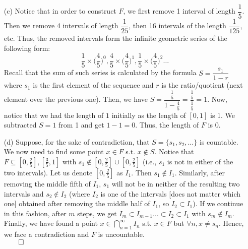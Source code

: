 \documentclass[11pt]{article}
\begin{document}
\begin{itemize}
\begin{itemize}
            \item[(c)]
                Notice that in order to construct $F$, we first remove 1
                interval of length $\dfrac{1}{5}$. Then we remove 4
                intervals of length $\dfrac{1}{25}$, then 16 intervals of
                the length $\dfrac{1}{125}$, etc. Thus, the removed intervals
                form the infinite geometric series of the following form:
                \begin{equation*}
                    \dfrac{1}{5} \times \Big(\dfrac{4}{5}\Big)^0, \dfrac{4}{5}
                    \times \Big(\dfrac{4}{5}\Big)^1, \dfrac{1}{5} \times
                    \Big(\dfrac{4}{5}\Big)^2 \dots
                \end{equation*}
                Recall that the sum of such series is calculated by the formula
                $S = \dfrac{s_1}{1 - r}$ where $s_1$ is the first element of
                the sequence and $r$ is the ratio/quotient (next element over
                the previous one). Then, we have $S = \dfrac{\frac{1}{5}}{1 -
                \frac{4}{5}} = \dfrac{\frac{1}{5}}{\frac{1}{5}} = 1$. Now,
                notice that we had the length of $1$ initially as the length of
                $[0, 1]$ is 1. We subtracted $S = 1$ from 1 and get $1 - 1 =
                0$. Thus, the length of $F$ is $0$.

            \item[(d)]
                Suppose, for the sake of contradiction, that $S = \{s_1, s_2,
                \dots\}$ is countable. We now need to find some point $x \in F$
                s.t. $x \notin S$. Notice that $F \subseteq [0, \frac{2}{5}],
                [\frac{3}{5}, 1]$ with $s_1 \notin [0, \frac{2}{5}] \cup [0,
                \frac{2}{5}]$ (i.e., $s_1$ is not in either of the two
                intervals). Let us denote $[0, \frac{2}{5}]$ as $I_1$. Then
                $s_1 \notin I_1$. Similarly, after removing the middle fifth of
                $I_1$, $s_1$ will not be in neither of the resulting two
                intervals and $s_2 \notin I_2$ (where $I_2$ is one of the
                intervals [does not matter which one] obtained after removing
                the middle half of $I_1$, so $I_2 \subset I_1$). If we continue
                in this fashion, after $m$ steps, we get $I_m \subset I_{m - 1}
                \dots \subset I_2 \subset I_1$ with $s_m \notin I_m$. Finally,
                we have found a point $x \in \displaystyle\bigcap_{n =
                1}^{\infty}I_n$ s.t. $x \in F$ but $\forall n, x \neq s_n$.
                Hence, we face a contradiction and $F$ is uncountable.\\
                $\qed$


\end{itemize}
\end{itemize}
\end{document}
